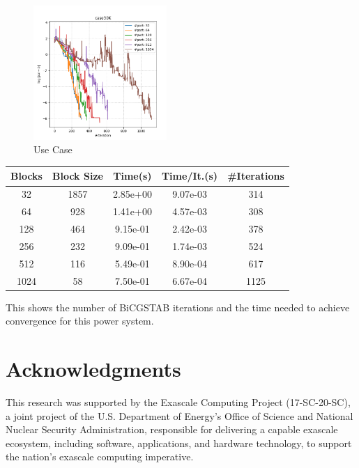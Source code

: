 \documentclass{juliacon}
\begin{document}
\begin{figure}
    \centering
    \includegraphics[width=0.45\textwidth]{figures/usecase.png}
    \caption{Use Case}
    \label{fig:usecase}
\end{figure}

\begin{table}[t]
    \begin{tabular}{ccccc}
    Blocks & Block Size & Time(s) &  Time/It.(s) & \#Iterations \\
    \hline
    32 &   1857 &       2.85e+00 &  9.07e-03 &  314 \\
    64 &   928  &       1.41e+00 &  4.57e-03 &  308 \\
    128 &   464  &       9.15e-01 &  2.42e-03 &  378 \\
    256 &   232  &       9.09e-01 &  1.74e-03 &  524 \\
    512 &   116  &       5.49e-01 &  8.90e-04 &  617 \\
    1024 &   58   &       7.50e-01 &  6.67e-04 & 1125 \\
    \end{tabular}
\end{table}


This shows the number of BiCGSTAB iterations and the time needed to achieve convergence for this power system.

\section{Acknowledgments}

This research was supported by the Exascale Computing Project (17-SC-20-SC), a joint project of the U.S. Department of Energy’s Office of Science and National Nuclear Security Administration, responsible for delivering a capable exascale ecosystem, including software, applications, and hardware technology, to support the nation’s exascale computing imperative.
\end{document}
